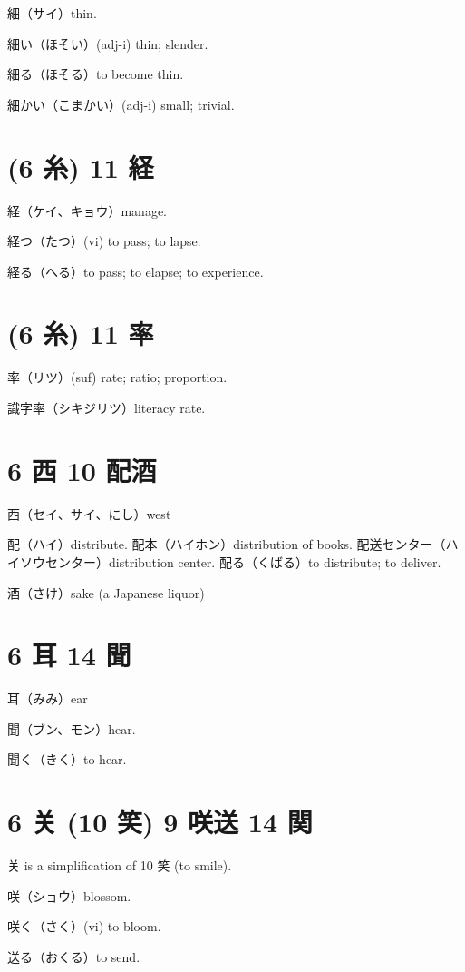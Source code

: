 細（サイ）thin.

細い（ほそい）(adj-i) thin; slender.

細る（ほそる）to become thin.

細かい（こまかい）(adj-i) small; trivial.

\section{(6 糸) 11 経}

経（ケイ、キョウ）manage.

経つ（たつ）(vi) to pass; to lapse.

経る（へる）to pass; to elapse; to experience.

\section{(6 糸) 11 率}

率（リツ）(suf) rate; ratio; proportion.

識字率（シキジリツ）literacy rate.

\section{6 西 10 配酒}

西（セイ、サイ、にし）west

配（ハイ）distribute.
配本（ハイホン）distribution of books.
配送センター（ハイソウセンター）distribution center.
配る（くばる）to distribute; to deliver.

酒（さけ）sake (a Japanese liquor)

\section{6 耳 14 聞}

耳（みみ）ear

聞（ブン、モン）hear.

聞く（きく）to hear.

\section{6 关 (10 笑) 9 咲送 14 関}

关 is a simplification of 10 笑 (to smile).

咲（ショウ）blossom.

咲く（さく）(vi) to bloom.

送る（おくる）to send.

